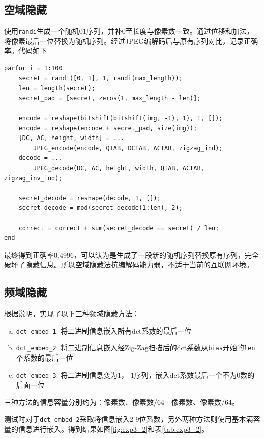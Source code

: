\documentclass[10pt, a4paper]{article}
\begin{document}
\subsection{空域隐藏}

使用\texttt{randi}生成一个随机01序列，并补0至长度与像素数一致。通过位移和加法，将像素最后一位替换为随机序列。经过JPEG编解码后与原有序列对比，记录正确率。代码如下

\begin{verbatim}
parfor i = 1:100
    secret = randi([0, 1], 1, randi(max_length));
    len = length(secret);
    secret_pad = [secret, zeros(1, max_length - len)];
    
    encode = reshape(bitshift(bitshift(img, -1), 1), 1, []);
    encode = reshape(encode + secret_pad, size(img));
    [DC, AC, height, width] = ... 
        JPEG_encode(encode, QTAB, DCTAB, ACTAB, zigzag_ind);
    decode = ... 
        JPEG_decode(DC, AC, height, width, QTAB, ACTAB, zigzag_inv_ind);

    secret_decode = reshape(decode, 1, []);
    secret_decode = mod(secret_decode(1:len), 2);

    correct = correct + sum(secret_decode == secret) / len;
end
\end{verbatim}

最终得到正确率0.4996，可以认为是生成了一段新的随机序列替换原有序列，完全破坏了隐藏信息。所以空域隐藏法抗编解码能力弱，不适于当前的互联网环境。

\subsection{频域隐藏}

根据说明，实现了以下三种频域隐藏方法：

\begin{enumerate}[a)]
    \item \texttt{dct_embed_1}: 将二进制信息嵌入所有dct系数的最后一位
    \item \texttt{dct_embed_2}: 将二进制信息嵌入经Zig-Zag扫描后的dct系数从\texttt{bias}开始的\texttt{len}个系数的最后一位
    \item \texttt{dct_embed_3}: 将二进制信息变为1，-1序列，嵌入dct系数最后一个不为0数的后面一位
\end{enumerate}

三种方法的信息容量分别约为：像素数、像素数/64 - 像素数、像素数/64。

测试时对于\texttt{dct_embed_2}采取将信息嵌入2-9位系数，另外两种方法则使用基本满容量的信息进行嵌入。得到结果如图\ref{fig:exp3_2}和表\ref{tab:exp3_2}。
\end{document}

